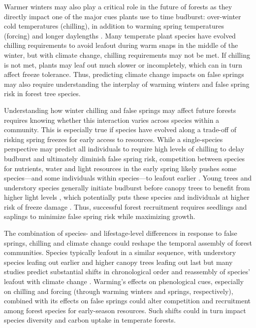 \documentclass{article}\usepackage[]{graphicx}\usepackage[]{color}
\begin{document}
\begin{enumerate}
Warmer winters may also play a critical role in the future of forests as they directly impact one of the  major cues plants use to time budburst: over-winter cold temperatures (chilling), in addition to warming spring temperatures (forcing) and longer daylengths \citep{Chuine2016}. Many temperate plant species have evolved chilling requirements to avoid leafout during warm snaps in the middle of the winter, but with climate change, chilling requirements may not be met. If chilling is not met, plants may leaf out much slower or incompletely, which can in turn affect freeze tolerance. Thus, predicting climate change impacts on false springs may also require understanding the interplay of warming winters and false spring risk in forest tree species. 
  
Understanding how winter chilling and false springs may affect future forests requires knowing whether this interaction varies across species within a community. This is especially true if species have evolved along a trade-off of risking spring freezes for early access to resources. While a single-species perspective may predict all individuals to require high levels of chilling to delay budburst and ultimately diminish false spring risk, competition between species for nutrients, water and light resources in the early spring likely pushes some species---and some individuals within species---to leafout earlier \citep{Augspurger2013}. Young trees and understory species generally initiate budburst before canopy trees to benefit from higher light levels \citep {Augspurger2008, Vitasse2013}, which potentially puts these species and individuals at higher risk of freeze damage \citep{Vitasse2014}. Thus, successful forest recruitment requires seedlings and saplings to minimize false spring risk while maximizing growth. 
 
The combination of species- and lifestage-level differences in response to false springs, chilling and climate change could reshape the temporal assembly of forest communities. Species typically leafout in a similar sequence, with understory species leafing out earlier and higher canopy trees leafing out last but many studies predict substantial shifts in chronological order and reassembly of species' leafout with climate change \citep{Laube2014, Roberts2015}. Warming's effects on phenological cues, especially on chilling and forcing (through warming winters and springs, respectively), combined with its effects on false springs could alter competition and recruitment among forest species for early-season resources. Such shifts could in turn impact species diversity and carbon uptake in temperate forests.
  

\end{enumerate}
\end{document}
